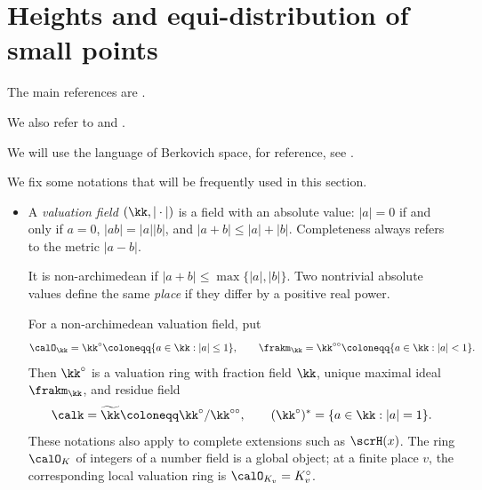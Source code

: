 \section{Heights and equi-distribution of small points}

The main references are \cite{Yuan-Guo-2025-FirstCourseArakelov}.

We also refer to \cite[Appendices~A.5--A.6 and \S 5.4]{Yuan-Zhang-2026-AdelicLineBundles} and \cite[Chapter~3]{Chambert-Loir-2012-ArakelovGeometryHeights}.

We will use the language of Berkovich space, for reference, see \cite{Berkovich-2012-SpectralTheoryAnalytic,Ducros-Favre-Nicaise-2015-BerkovichSpacesApplications}.

\begin{notation}[label=\labelNFM{not:berkovich-space-and-a-geometry}, status=draft, tag=0000000]
	We fix some notations that will be frequently used in this section.
	\begin{itemize}
		\item {}
		      \begin{latexmathchange}
		      A \emph{valuation field} $(\kk,|\cdot|)$ is a field with an absolute value:
		      $|a| = 0$ if and only if $a = 0$, $|ab| = |a||b|$, and $|a+b| \leq |a|+|b|$.
		      Completeness always refers to the metric $|a-b|$.
		      \end{latexmathchange}
		      It is non-archimedean if $|a + b| \leq \max\{|a|,|b|\}$.
		      Two nontrivial absolute values define the same \emph{place} if they differ by a positive real power.
		      \Yang{}
		      \begin{latexmathchange}
		      For a non-archimedean valuation field, put
		      \[ \calO_\kk = \kk^\circ \coloneqq \{a \in \kk : |a| \leq 1\}, \qquad \frakm_\kk = \kk^{\circ\circ} \coloneqq \{a \in \kk : |a| < 1\}. \]
		      Then $\kk^\circ$ is a valuation ring with fraction field $\kk$, unique maximal ideal $\frakm_\kk$, and residue field
		      \[ \calk = \widetilde{\kk} \coloneqq \kk^\circ/\kk^{\circ\circ}, \qquad (\kk^\circ)^* = \{a \in \kk : |a| = 1\}. \]
		      These notations also apply to complete extensions such as $\scrH(x)$.
		      The ring $\calO_K$ of integers of a number field is a global object; at a finite place $v$, the corresponding local valuation ring is $\calO_{K_v} = K_v^\circ$.

\end{latexmathchange}
\end{itemize}
\end{notation}
